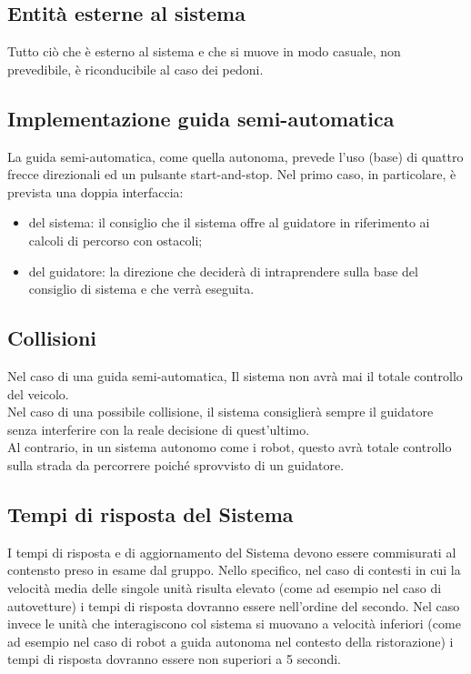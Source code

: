 \documentclass[]{article}
\begin{document}
		\subsection{Entità esterne al sistema}
		Tutto ciò che è esterno al sistema e che si muove in modo casuale, non prevedibile, è riconducibile al caso dei pedoni.

		\subsection{Implementazione guida semi-automatica}
		La guida semi-automatica, come quella autonoma, prevede l'uso (base) di quattro frecce direzionali ed un pulsante start-and-stop.
		Nel primo caso, in particolare, è prevista una doppia interfaccia:
		\begin{itemize}
			\item del sistema: il consiglio che il sistema offre al guidatore in riferimento ai calcoli di percorso con ostacoli;
			\item del guidatore: la direzione che deciderà di intraprendere sulla base del consiglio di sistema e che verrà eseguita.
		\end{itemize}


		\subsection{Collisioni}
		Nel caso di una guida semi-automatica, Il sistema non avrà mai il totale controllo del veicolo.\\
		Nel caso di una possibile collisione, il sistema consiglierà sempre il guidatore senza interferire con la reale decisione di quest'ultimo. \\
		Al contrario, in un sistema autonomo come i robot, questo avrà totale controllo sulla strada da percorrere poiché sprovvisto di un guidatore.

		\subsection{Tempi di risposta del Sistema}
		I tempi di risposta e di aggiornamento del Sistema devono essere commisurati al contensto preso in esame dal gruppo. Nello specifico, nel caso di contesti
		in cui la velocità media delle singole unità risulta elevato (come ad esempio nel caso di autovetture) i tempi di risposta dovranno essere nell'ordine del secondo.
		Nel caso invece le unità che interagiscono col sistema si muovano a velocità inferiori (come ad esempio nel caso di robot a guida autonoma nel
		contesto della ristorazione) i tempi di risposta dovranno essere non superiori a 5 secondi.
\end{document}

